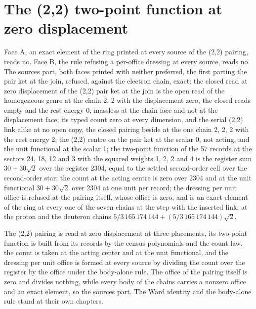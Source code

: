 \section{The (2,2) two-point function at zero displacement}\label{mod:X-0-D542381-w-twpg}
\begin{chwall}
Face A, an exact element of the ring printed at every source of the (2,2) pairing, reads no. Face B, the rule refusing a per-office dressing at every source, reads no. The sources part, both faces printed with neither preferred, the first parting the pair ket at the join, refused, against the electron chain, exact: the closed read at zero displacement of the (2,2) pair ket at the join is the open read of the homogeneous genre at the chain 2, 2 with the displacement zero, the closed reads empty and the rest energy 0, massless at the chain face and not at the displacement face, its typed count zero at every dimension, and the serial (2,2) link alike at no open copy, the closed pairing beside at the one chain 2, 2, 2 with the rest energy 2; the (2,2) centre on the pair ket at the scalar 0, not acting, and the unit functional at the scalar 1; the two-point function of the 57 records at the sectors 24, 18, 12 and 3 with the squared weights 1, 2, 2 and 4 is the register sum $30 + 30\sqrt{2}$ over the register 2304, equal to the settled second-order cell over the second-order star; the count at the acting centre is zero over 2304 and at the unit functional $30 + 30\sqrt{2}$ over 2304 at one unit per record; the dressing per unit office is refused at the pairing itself, whose office is zero, and is an exact element of the ring at every one of the seven chains at the step with the inserted link, at the proton and the deuteron chains $5/3\,165\,174\,144 + (5/3\,165\,174\,144)\sqrt{2}$.
\end{chwall}
\chdeps{}{}
The (2,2) pairing is read at zero displacement at three placements, its two-point function is built from its records by the census polynomials and the count law, the count is taken at the acting center and at the unit functional, and the dressing per unit office is formed at every source by dividing the count over the register by the office under the body-alone rule. The office of the pairing itself is zero and divides nothing, while every body of the chains carries a nonzero office and an exact element, so the sources part. The Ward identity and the body-alone rule stand at their own chapters.
